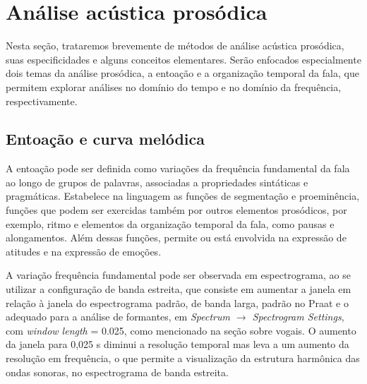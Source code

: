 \documentclass[portuguese]{textolivre}
\begin{document}
\section{Análise acústica prosódica}\label{sec-prosodia}
Nesta seção, trataremos brevemente de métodos de análise acústica prosódica, suas especificidades e alguns conceitos elementares. Serão enfocados especialmente dois temas da análise prosódica, a entoação e a organização temporal da fala, que permitem explorar análises no domínio do tempo e no domínio da frequência, respectivamente.

\subsection{Entoação e curva melódica}\label{sec-entoacao}
A entoação pode ser definida como variações da frequência fundamental da fala ao longo de grupos de palavras, associadas a propriedades sintáticas e pragmáticas. Estabelece na linguagem as funções de segmentação e proeminência, funções que podem ser exercidas também por outros elementos prosódicos, por exemplo, ritmo e elementos da organização temporal da fala, como pausas e alongamentos. Além dessas funções, permite ou está envolvida na expressão de atitudes e na expressão de emoções.

A variação frequência fundamental pode ser observada em espectrograma, ao se utilizar a configuração de banda estreita, que consiste em aumentar a janela em relação à janela do espectrograma padrão, de banda larga, padrão no Praat e o adequado para a análise de formantes, em \textit{Spectrum $\rightarrow$ Spectrogram Settings}, com \textit{window length} = 0.025, como mencionado na seção sobre vogais. O aumento da janela para 0,025 s diminui a resolução temporal mas leva a um aumento da resolução em frequência, o que permite a visualização da estrutura harmônica das ondas sonoras, no espectrograma de banda estreita.
\end{document}
